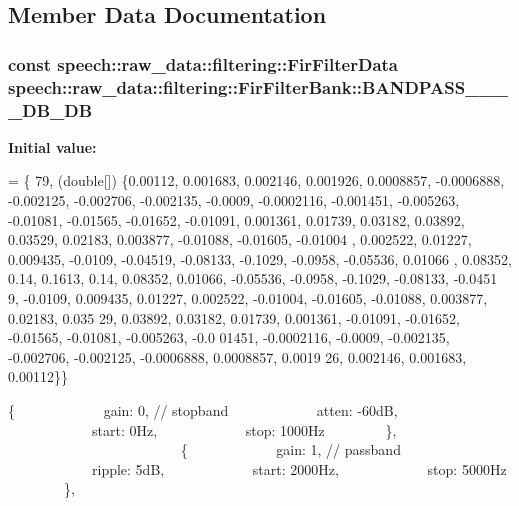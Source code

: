 \subsection{Member Data Documentation}
\hypertarget{classspeech_1_1raw__data_1_1filtering_1_1FirFilterBank_a28029922c12b58351adda2556609499d}{
\subsubsection[{B\+A\+N\+D\+P\+A\+S\+S\+\_\+44100\+\_\+2000\+\_\+5000\+\_\+5\+D\+B\+\_\+60\+D\+B}]{\setlength{\rightskip}{0pt plus 5cm}const {\bf speech\+::raw\+\_\+data\+::filtering\+::\+Fir\+Filter\+Data} speech\+::raw\+\_\+data\+::filtering\+::\+Fir\+Filter\+Bank\+::\+B\+A\+N\+D\+P\+A\+S\+S\+\_\+\_\+\_\+\_\+D\+B\+\_\+D\+B\hspace{0.3cm}{\ttfamily [static]}}}\label{classspeech_1_1raw__data_1_1filtering_1_1FirFilterBank_a28029922c12b58351adda2556609499d}
{\bfseries Initial value\+:}
\begin{DoxyCode}
= \{
        79, (\textcolor{keywordtype}{double}[]) \{0.00112, 0.001683, 0.002146, 0.001926, 0.0008857, -0.0006888, -0.002125, -0.002706,
       -0.002135,
                        -0.0009, -0.0002116, -0.001451, -0.005263, -0.01081, -0.01565, -0.01652, -0.01091, 
      0.001361,
                        0.01739, 0.03182, 0.03892, 0.03529, 0.02183, 0.003877, -0.01088, -0.01605, -0.01004
      , 0.002522,
                        0.01227, 0.009435, -0.0109, -0.04519, -0.08133, -0.1029, -0.0958, -0.05536, 0.01066
      , 0.08352,
                        0.14, 0.1613, 0.14, 0.08352, 0.01066, -0.05536, -0.0958, -0.1029, -0.08133, -0.0451
      9, -0.0109,
                        0.009435, 0.01227, 0.002522, -0.01004, -0.01605, -0.01088, 0.003877, 0.02183, 0.035
      29, 0.03892,
                        0.03182, 0.01739, 0.001361, -0.01091, -0.01652, -0.01565, -0.01081, -0.005263, -0.0
      01451,
                        -0.0002116, -0.0009, -0.002135, -0.002706, -0.002125, -0.0006888, 0.0008857, 0.0019
      26, 0.002146,
                        0.001683, 0.00112\}\}
\end{DoxyCode}
\{             gain\+: 0, // stopband             atten\+: -\/60d\+B,             start\+: 0\+Hz,             stop\+: 1000\+Hz         \},                          \{             gain\+: 1, // passband             ripple\+: 5d\+B,             start\+: 2000\+Hz,             stop\+: 5000\+Hz         \},

